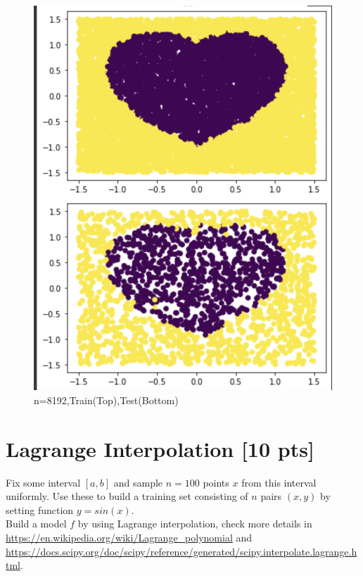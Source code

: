 \documentclass[a4paper]{article}
\theoremstyle{definition}
\newenvironment{soln}{
    \leavevmode\color{blue}\ignorespaces
}{}
\begin{document}
\begin{soln}
\begin{figure}[H]
            \includegraphics[scale=0.5]{sk8192.png}
            \caption{n=8192,Train(Top),Test(Bottom)}
            \label{fig:q2}
        \end{figure} 
  \end{soln}
  
\section{Lagrange Interpolation [10 pts]}
Fix some interval $[a, b]$ and sample $n = 100$ points $x$ from this interval uniformly. Use these to build a training set consisting of $n$ pairs $(x, y)$ by setting function $y = sin(x)$. \\

Build a model $f$ by using Lagrange interpolation, check more details in \url{https://en.wikipedia.org/wiki/Lagrange_polynomial} and \url{https://docs.scipy.org/doc/scipy/reference/generated/scipy.interpolate.lagrange.html}. \\
\end{document}
